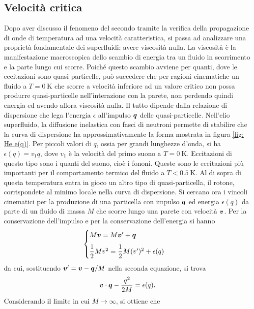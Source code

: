 \subsection{Velocità critica}
Dopo aver discusso il fenomeno del secondo tramite la verifica della propagazione di onde di temperatura ad una velocità caratteristica, si passa ad analizzare una proprietà fondamentale dei superfluidi: avere viscosità nulla. La viscosità è la manifestazione macroscopica dello scambio di energia tra un fluido in scorrimento e la parte lungo cui scorre. Poiché questo scambio avviene per quanti, dove le eccitazioni sono quasi-particelle, può succedere che per ragioni cinematiche un fluido a $T = \SI{0}{\kelvin}$ che scorre a velocità inferiore ad un valore critico non possa produrre quasi-particelle nell'interazione con la parete, non perdendo quindi energia ed avendo allora viscosità nulla. Il tutto dipende dalla relazione di dispersione che lega l'energia $\epsilon$ all'impulso $\bm{q}$ delle quasi-particelle. Nell'elio superfluido, la diffusione inelastica con fasci di neutroni permette di stabilire che la curva di dispersione ha approssimativamente la forma mostrata in figura \ref{fig: He e(q)}. Per piccoli valori di $q$, ossia per grandi lunghezze d'onda, si ha $\epsilon(q) = v_1 q$, dove $v_1$ è la velocità del primo suono a $T = \SI{0}{\kelvin}$. Eccitazioni di questo tipo sono i quanti del suono, cioè i fononi. Queste sono le eccitazioni più importanti per il comportamento termico del fluido a $T < \SI{0.5}{\kelvin}$. Al di sopra di questa temperatura entra in gioco un altro tipo di quasi-particella, il rotone, corrispondete al minimo locale nella curva di dispersione. Si cercano ora i vincoli cinematici per la produzione di una particella con impulso $\bm{q}$ ed energia $\epsilon(q)$ da parte di un fluido di massa $M$ che scorre lungo una parete con velocità $\bm{v}$. Per la conservazione dell'impulso e per la conservazione dell'energia si hanno
\begin{equation}
    \begin{cases}
        M\bm{v} = M\bm{v}' + \bm{q} \\[1.5ex]
        \dfrac{1}{2}Mv^2 = \dfrac{1}{2}M(v')^2 + \epsilon(q)
    \end{cases}
\end{equation}
da cui, sostituendo $\bm{v}' = \bm{v} - \bm{q}/M$ nella seconda equazione, si trova
\begin{equation}
    \bm{v} \cdot \bm{q} - \frac{q^2}{2M} = \epsilon(q).
\end{equation}
Considerando il limite in cui $M \to \infty$, si ottiene che
